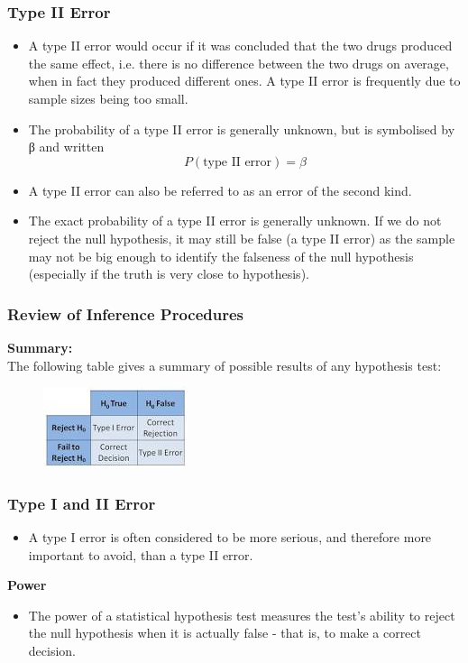 \documentclass{beamer}
\begin{document}
\begin{frame}
			\frametitle{Type II Error}
			\large
			\begin{itemize}
				\item A type II error would occur if it was concluded that the two drugs
				produced the same effect, i.e. there is no difference between the
				two drugs on average, when in fact they produced different ones.
				A type II error is frequently due to sample sizes being too small.
				\item The probability of a type II error is generally unknown, but is
				symbolised by β and written
				\[P(\mbox{type II error}) = \beta\]
				\item A type II error can also be referred to as an error of the second
				kind.
				\item The exact probability of a type II error is generally unknown.
				If we do not reject the null hypothesis, it may still be false (a type
				II error) as the sample may not be big enough to identify the
				falseness of the null hypothesis (especially if the truth is very close
				to hypothesis).
			\end{itemize}
		\end{frame}
\begin{frame}
			\frametitle{Review of Inference Procedures}
			\large
			
			\textbf{Summary:}\\
			The following table gives a summary of possible results of any
			hypothesis test:
			\begin{figure}
				\centering
				\includegraphics[width=0.6\linewidth]{ErrorTypeTable}
				
			\end{figure}
			
			
\end{frame}
\begin{frame}
\frametitle{Type I and II Error}
\large
\begin{itemize}
\item A type I error is often considered to be more serious, and therefore
				more important to avoid, than a type II error. 
\end{itemize}
\textbf{Power}
\begin{itemize}
\item The power of a statistical hypothesis test measures the test's ability
to reject the null hypothesis when it is actually false - that is, to
make a correct decision.
\end{itemize}
\end{frame}
\end{document}
